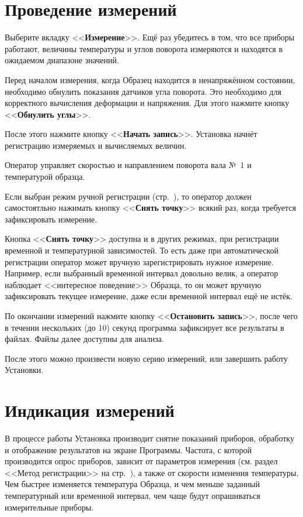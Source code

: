 \documentclass[12pt, a4paper, twocolumn]{report}
\newcommand{\CTL}[1]{<<{\bf #1}>>}
\begin{document}
\section{Проведение измерений}

Выберите вкладку \CTL{Измерение}. Ещё раз убедитесь в том, что все приборы работают, величины температуры и углов поворота  измеряются и находятся в ожидаемом диапазоне значений.

Перед началом измерения, когда Образец находится в ненапряжённом состоянии, необходимо обнулить показания датчиков угла поворота. Это необходимо для корректного вычисления деформации и напряжения. Для этого нажмите кнопку \CTL{Обнулить углы}.

После этого нажмите кнопку \CTL{Начать запись}. Установка начнёт регистрацию измеряемых и вычисляемых величин.

Оператор управляет скоростью и направлением поворота вала №~1 и температурой образца.

Если выбран режим ручной регистрации (стр.~\pageref{sec_reg_type_manual}), то оператор должен самостоятльно нажимать кнопку \CTL{Снять точку}\label{sec_manual} всякий раз, когда требуется зафиксировать измерение.

Кнопка \CTL{Снять точку} доступна и в других режимах, при регистрации временной и температурной зависимостей. То есть даже при автоматической регистрации оператор может вручную зарегистрировать нужное измерение. Например, если выбранный временной интервал довольно велик, а оператор наблюдает <<интересное поведение>> Образца, то он может вручную зафиксировать текущее измерение, даже если временной интервал ещё не истёк.

По окончании измерений нажмите кнопку \CTL{Остановить запись}, после чего в течении нескольких (до 10) секунд программа зафиксирует все результаты в файлах. Файлы далее доступны для анализа.

После этого можно произвести новую серию измерений, или завершить работу Установки.

\section{Индикация измерений}

В процессе работы Установка производит снятие показаний приборов, обработку и отображение результатов на экране Программы. Частота, с которой производится опрос приборов, зависит от параметров измерения (см. раздел <<Метод регистрации>> на стр.~\pageref{sec_reg_method}), а также от скорости изменения температуры. Чем быстрее изменяется температура Образца, и чем меньше заданный температурный или временной интервал, чем чаще будут опрашиваться измерительные приборы.
\end{document}
